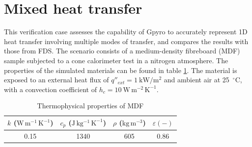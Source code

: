 \documentclass[12pt]{article}
\begin{document}
\fi

\section{Mixed heat transfer}
This verification case assesses the capability of Gpyro to accurately represent 1D heat transfer involving multiple modes of transfer, and compares the results with those from FDS. The scenario consists of a medium-density fibreboard (MDF) sample subjected to a cone calorimeter test in a nitrogen atmosphere. The properties of the simulated materials can be found in table \ref{tab:phys_props_mdf}. The material is exposed to an external heat flux of $q''_{ext}=1~\mathrm{kW/m^2}$ and ambient air at 25~$^\circ$C, with a convection coefficient of $h_c = 10~\mathrm{W\,m^{-2}\,K^{-1}}$.

\begin{table}[H]
\centering
\caption{Thermophysical properties of MDF}
\label{tab:phys_props_mdf}
\renewcommand{\arraystretch}{1.3} %
\begin{tabular}{c c c c}
\hline
$k$ ($\mathrm{W\,m^{-1}\,K^{-1}}$) & 
$c_p$ ($\mathrm{J\,kg^{-1}\,K^{-1}}$) & 
$\rho$ ($\mathrm{kg\,m^{-3}}$) & 
$\varepsilon (-)$ \\
\hline
0.15 & 1340 & 605 & 0.86 \\
\hline
\end{tabular}
\end{table}
\end{document}
